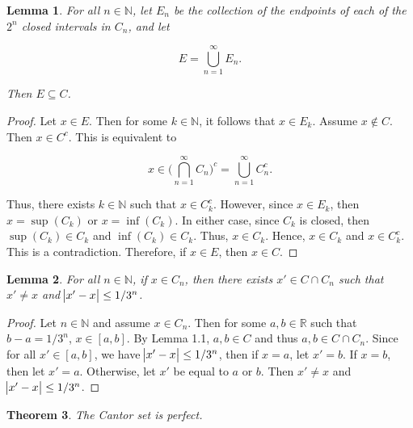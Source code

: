 \documentclass{article}
\newtheorem{theorem}{Theorem}[section]
\newtheorem{lemma}[theorem]{Lemma}
\theoremstyle{definition}
\theoremstyle{remark}
\theoremstyle{definition}
\begin{document}
\newpage
    
\begin{lemma}
    For all $n\in\mathbb{N}$, let $E_n$ be the collection of the endpoints of each of the $2^n$ closed intervals in $C_n$, and let 
        
    \begin{equation*}
        E=\bigcup_{n=1}^{\infty} E_n.
    \end{equation*}
        
    \noindent Then $E\subseteq C$.
\end{lemma}
    
\begin{proof}
    Let $x\in E$. Then for some $k\in\mathbb{N}$, it follows that $x\in E_k$. Assume $x\notin C$. Then $x\in C^c$. This is equivalent to 
        
    \begin{equation*}
        x\in\bigg(\bigcap_{n=1}^{\infty}C_n\bigg)^c=\bigcup_{n=1}^{\infty}C_n^c.
    \end{equation*}
        
    \noindent Thus, there exists $k\in\mathbb{N}$ such that $x\in C_k^c$. However, since $x\in E_k$, then $x=\sup(C_k)$ or $x=\inf(C_k)$. In either case, since $C_k$ is closed, then $\sup(C_k)\in C_k$ and $\inf(C_k)\in C_k$. Thus, $x\in C_k$. Hence, $x\in C_k$ and $x\in C_k^c$. This is a contradiction. Therefore, if $x\in E$, then $x\in C$. 
\end{proof}
    
\begin{lemma}
    For all $n\in\mathbb{N}$, if $x\in C_n$, then there exists $x'\in C\cap C_n$ such that $x'\neq x$ and $\abs{x'-x}\leq 1/3^n$.
\end{lemma}
    
\begin{proof}
    Let $n\in\mathbb{N}$ and assume $x\in C_n$. Then for some $a,b\in\mathbb{R}$ such that $b-a=1/3^n$, $x\in[a,b]$. By Lemma 1.1, $a,b\in C$ and thus $a,b\in C\cap C_n$. Since for all $x'\in[a,b]$, we have  $\abs{x'-x}\leq 1/3^n$, then if $x=a$, let $x'=b$. If $x=b$, then let $x'=a$. Otherwise, let $x'$ be equal to $a$ or $b$. Then $x'\neq x$ and $\abs{x'-x}\leq 1/3^n$.
\end{proof}
    
\begin{theorem}
    The Cantor set is perfect.
\end{theorem}
    
\end{document}
